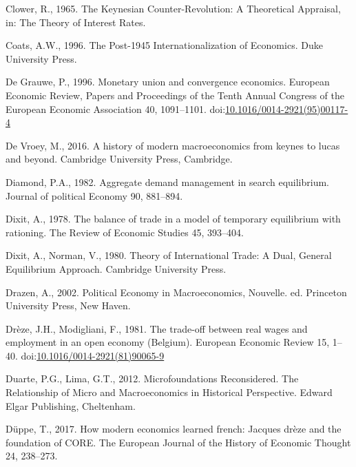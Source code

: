 \documentclass[
  12pt,
  onecolumn]{article}
\newlength{\cslhangindent}
\newlength{\cslentryspacingunit} %
\newenvironment{CSLReferences}[2] %
 {%
  \setlength{\parindent}{0pt}
  \ifodd #1
  \let\oldpar\par
  \def\par{\hangindent=\cslhangindent\oldpar}
  \fi
  \setlength{\parskip}{#2\cslentryspacingunit}
 }%
 {}
\begin{document}
\begin{CSLReferences}{1}{0}
\leavevmode{}%
Clower, R., 1965. The {Keynesian Counter-Revolution}: {A Theoretical
Appraisal}, in: The {Theory} of {Interest Rates}.

\leavevmode{}%
Coats, A.W., 1996. The Post-1945 Internationalization of Economics. Duke
University Press.

\leavevmode{}%
De Grauwe, P., 1996. Monetary union and convergence economics. European
Economic Review, Papers and {Proceedings} of the {Tenth Annual Congress}
of the {European Economic Association} 40, 1091--1101.
doi:\href{https://doi.org/10.1016/0014-2921(95)00117-4}{10.1016/0014-2921(95)00117-4}

\leavevmode{}%
De Vroey, M., 2016. A history of modern macroeconomics from keynes to
lucas and beyond. Cambridge University Press, Cambridge.

\leavevmode{}%
Diamond, P.A., 1982. Aggregate demand management in search equilibrium.
Journal of political Economy 90, 881--894.

\leavevmode{}%
Dixit, A., 1978. The balance of trade in a model of temporary
equilibrium with rationing. The Review of Economic Studies 45, 393--404.

\leavevmode{}%
Dixit, A., Norman, V., 1980. Theory of {International Trade}: {A Dual},
{General Equilibrium Approach}. {Cambridge University Press}.

\leavevmode{}%
Drazen, A., 2002. Political {Economy} in {Macroeconomics}, Nouvelle. ed.
{Princeton University Press}, {New Haven}.

\leavevmode{}%
Drèze, J.H., Modigliani, F., 1981. The trade-off between real wages and
employment in an open economy ({Belgium}). European Economic Review 15,
1--40.
doi:\href{https://doi.org/10.1016/0014-2921(81)90065-9}{10.1016/0014-2921(81)90065-9}

\leavevmode{}%
Duarte, P.G., Lima, G.T., 2012. Microfoundations {Reconsidered}. {The
Relationship} of {Micro} and {Macroeconomics} in {Historical
Perspective}. {Edward Elgar Publishing}, {Cheltenham}.

\leavevmode{}%
Düppe, T., 2017. How modern economics learned french: Jacques drèze and
the foundation of CORE. The European Journal of the History of Economic
Thought 24, 238--273.


\end{CSLReferences}
\end{document}
